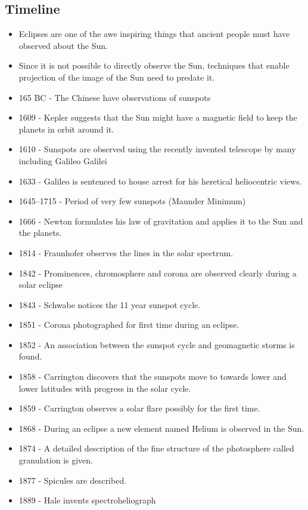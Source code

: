 \documentclass{../template/texnote}
\begin{document}
	\subsection{Timeline}
\begin{itemize}
	\item Eclipses are one of the awe inspiring things that ancient people must have observed about the Sun.
	\item Since it is not possible to directly observe the Sun, techniques that enable projection of the image of the Sun need to predate it.
	\item 165 BC - The Chinese have observations of sunspots
	\item 1609 - Kepler suggests that the Sun might have a magnetic field to keep the planets in orbit around it.
	\item 1610 - Sunspots are observed using the recently invented telescope by many including Galileo Galilei
	\item 1633 - Galileo is sentenced to house arrest for his heretical heliocentric views.
	\item 1645–1715 - Period of very few sunspots (Maunder Minimum)
	\item 1666 - Newton formulates his law of gravitation and applies it to the Sun and the planets.
	\item 1814 - Fraunhofer observes the lines in the solar spectrum.
	\item 1842 - Prominences, chromosphere and corona are observed clearly during a solar eclipse
	\item 1843 - Schwabe notices the 11 year sunspot cycle.
	\item 1851 - Corona photographed for first time during an eclipse.
	\item 1852 - An association between the sunspot cycle and geomagnetic storms is found.
	\item 1858 - Carrington discovers that the sunspots move to towards lower and lower latitudes with progress in the solar cycle.
	\item 1859 - Carrington observes a solar flare possibly for the first time.
	\item 1868 - During an eclipse a new element named Helium is observed in the Sun.
	\item 1874 - A detailed description of the fine structure of the photosphere called granulation is given.
	\item 1877 - Spicules are described.
	\item 1889 - Hale invents spectroheliograph

\end{itemize}
\end{document}
